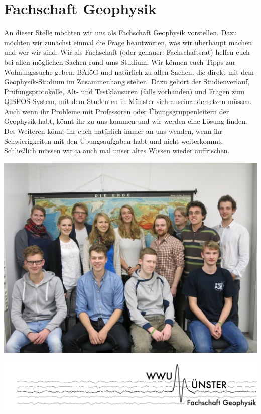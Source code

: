 
\section{Fachschaft Geophysik}
\begin{multicols*}{2}
An dieser Stelle möchten wir uns als Fachschaft Geophysik vorstellen. Dazu möchten wir zunächst einmal die Frage beantworten, was wir überhaupt machen und wer wir sind. Wir als Fachschaft (oder genauer: Fachschaftsrat) helfen euch bei allen möglichen Sachen rund ums Studium. Wir können euch Tipps zur Wohnungssuche geben, BAföG und natürlich zu allen Sachen, die direkt mit dem Geophysik-Studium im Zusammenhang stehen. Dazu gehört der Studienverlauf, Prüfungsprotokolle, Alt- und Testklausuren (falls vorhanden) und Fragen zum QISPOS-System, mit dem Studenten in Münster sich auseinandersetzen müssen. Auch wenn ihr Probleme mit Professoren oder Übungsgruppenleitern der Geophysik habt, könnt ihr zu uns kommen und wir werden eine Lösung finden. Des Weiteren könnt ihr euch natürlich immer an uns wenden, wenn ihr Schwierigkeiten mit den Übungsaufgaben habt und nicht weiterkommt. Schließlich müssen wir ja auch mal unser altes Wissen wieder auffrischen.

\begin{center}
\includegraphics[width=\columnwidth]{res/fs_geophysik_foto}
\end{center}
\vspace{-1.5em}
\includegraphics[width=\columnwidth]{res/fs_geophysik_logo.png}
\vspace{-1.5em}


\end{multicols*}
